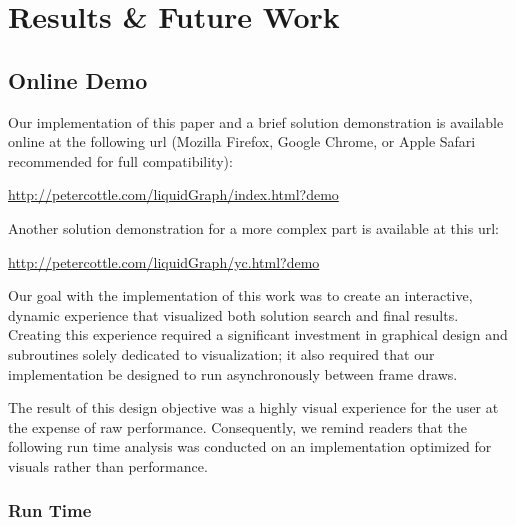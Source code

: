           \chapter{Results \& Future Work}\label{results}


\section{Online Demo}

Our implementation of this paper and a brief solution demonstration is available online at the following url (Mozilla Firefox, Google Chrome, or Apple Safari recommended for full compatibility):

\vspace{0.2in}

\begin{centering}
\url{http://petercottle.com/liquidGraph/index.html?demo}
\end{centering}

\vspace{0.2in}

Another solution demonstration for a more complex part is available at this url:

\vspace{0.2in}

\begin{centering}
\url{http://petercottle.com/liquidGraph/yc.html?demo}
\end{centering}

\vspace{0.2in}


\newpage



Our goal with the implementation of this work was to create an interactive, dynamic experience that visualized both solution search and final results. Creating this experience required a significant investment in graphical design and subroutines solely dedicated to visualization; it also required that our implementation be designed to run asynchronously between frame draws.

The result of this design objective was a highly visual experience for the user at the expense of raw performance. Consequently, we remind readers that the following run time analysis was conducted on an implementation optimized for visuals rather than performance.

  \subsection{Run Time}

